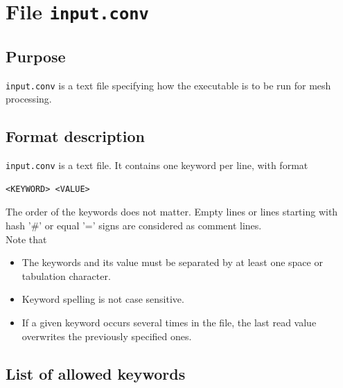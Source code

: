 \hypertarget{InputConvFormat}{}
\section{File \texttt{input.conv}}
\subsection{Purpose}
\texttt{input.conv} is a text file specifying how the \swConverter executable is to be run for mesh processing. 

\subsection{Format description}
\texttt{input.conv} is a text file. It contains one keyword per line, with format
\begin{lstlisting}
<KEYWORD> <VALUE>
\end{lstlisting}
The order of the keywords does not matter. Empty lines or lines starting with hash '\#' or equal '=' signs are considered as comment lines.\\
Note that
\begin{itemize}
\item The keywords and its value must be separated by at least one space or tabulation character.
\item Keyword spelling is not case sensitive.
\item If a given keyword occurs several times in the file, the last read value overwrites the previously specified ones.
\end{itemize}

\subsection{List of allowed keywords}



